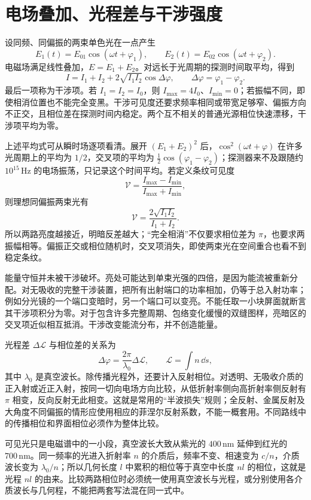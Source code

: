 \section{电场叠加、光程差与干涉强度}



设同频、同偏振的两束单色光在一点产生
\[
 E_1(t)=E_{01}\cos(\omega t+\varphi_1),\qquad
 E_2(t)=E_{02}\cos(\omega t+\varphi_2).
\]
电磁场满足线性叠加，$E=E_1+E_2$。对远长于光周期的探测时间取平均，得到
\begin{equation}
 I=I_1+I_2+2\sqrt{I_1I_2}\cos\Delta\varphi,\qquad
 \Delta\varphi=\varphi_1-\varphi_2.
\end{equation}
最后一项称为干涉项。若 $I_1=I_2=I_0$，则 $I_{\max}=4I_0$、$I_{\min}=0$；若振幅不同，即使相消位置也不能完全变黑。干涉可见度还要求频率相同或带宽足够窄、偏振方向不正交，且相位差在探测时间内稳定。两个互不相关的普通光源相位快速漂移，干涉项平均为零。

上述平均式可从瞬时场逐项看清。展开 $(E_1+E_2)^2$ 后，$\cos^2(\omega t+\varphi)$ 在许多光周期上的平均为 $1/2$，交叉项的平均为 $\tfrac12\cos(\varphi_1-\varphi_2)$；探测器来不及跟随约 $10^{15}\,\mathrm{Hz}$ 的电场振荡，只记录这个时间平均。若定义条纹可见度
\[
 \mathcal V=\frac{I_{\max}-I_{\min}}{I_{\max}+I_{\min}},
\]
则理想同偏振两束光有
\[
 \mathcal V=\frac{2\sqrt{I_1I_2}}{I_1+I_2}.
\]
所以两路亮度越接近，明暗反差越大；“完全相消”不仅要求相位差为 $\pi$，也要求两振幅相等。偏振正交或相位随机时，交叉项消失，即使两束光在空间重合也看不到稳定条纹。

能量守恒并未被干涉破坏。亮处可能达到单束光强的四倍，是因为能流被重新分配。对无吸收的完整干涉装置，把所有出射端口的功率相加，仍等于总入射功率；例如分光镜的一个端口变暗时，另一个端口可以变亮。不能任取一小块屏面就断言其干涉项积分为零。对于包含许多完整周期、包络变化缓慢的双缝图样，亮暗区的交叉项近似相互抵消。干涉改变能流分布，并不创造能量。

光程差 $\Delta\mathcal L$ 与相位差的关系为
\begin{equation}
 \Delta\varphi=\frac{2\pi}{\lambda_0}\Delta\mathcal L,\qquad
 \mathcal L=\int n\,\dd s,
\end{equation}
其中 $\lambda_0$ 是真空波长。除传播光程外，还要计入反射相位。对透明、无吸收介质的正入射或近正入射，按同一切向电场方向比较，从低折射率侧向高折射率侧反射有 $\pi$ 相变，反向反射无此相变。这就是常用的“半波损失”规则；全反射、金属反射及大角度不同偏振的情形应使用相应的菲涅尔反射系数，不能一概套用。不同路线中的传播相位和界面相位必须作为整体比较。

可见光只是电磁谱中的一小段，真空波长大致从紫光的 $400\,\mathrm{nm}$ 延伸到红光的 $700\,\mathrm{nm}$。同一频率的光进入折射率 $n$ 的介质后，频率不变、相速变为 $c/n$，介质波长变为 $\lambda_0/n$；所以几何长度 $l$ 中累积的相位等于真空中长度 $nl$ 的相位，这就是光程 $nl$ 的由来。比较两路相位时必须统一使用真空波长与光程，或分别使用各介质波长与几何程，不能把两套写法混在同一式中。



